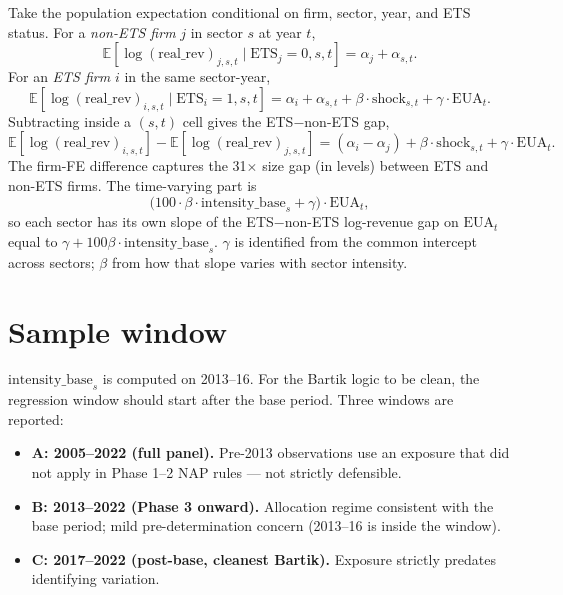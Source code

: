 \documentclass[11pt]{article}
\begin{document}
Take the population expectation conditional on firm, sector, year, and ETS status. For a \emph{non-ETS firm} $j$ in sector $s$ at year $t$,
\begin{equation}
  \mathbb{E}[\log(\mathrm{real\_rev})_{j,s,t} \mid \mathrm{ETS}_j = 0, s, t] = \alpha_j + \alpha_{s,t}. \label{eq:cond_nonets}
\end{equation}
For an \emph{ETS firm} $i$ in the same sector-year,
\begin{equation}
  \mathbb{E}[\log(\mathrm{real\_rev})_{i,s,t} \mid \mathrm{ETS}_i = 1, s, t] = \alpha_i + \alpha_{s,t} + \beta \cdot \mathrm{shock}_{s,t} + \gamma \cdot \mathrm{EUA}_t. \label{eq:cond_ets}
\end{equation}
Subtracting inside a $(s,t)$ cell gives the ETS$-$non-ETS gap,
\begin{equation}
  \mathbb{E}[\log(\mathrm{real\_rev})_{i,s,t}] - \mathbb{E}[\log(\mathrm{real\_rev})_{j,s,t}] = (\alpha_i - \alpha_j) + \beta \cdot \mathrm{shock}_{s,t} + \gamma \cdot \mathrm{EUA}_t.
\end{equation}
The firm-FE difference captures the 31$\times$ size gap (in levels) between ETS and non-ETS firms. The time-varying part is
\[
  \big(100 \cdot \beta \cdot \mathrm{intensity\_base}_s + \gamma\big) \cdot \mathrm{EUA}_t,
\]
so each sector has its own slope of the ETS$-$non-ETS log-revenue gap on $\mathrm{EUA}_t$ equal to $\gamma + 100\beta \cdot \mathrm{intensity\_base}_s$. $\gamma$ is identified from the common intercept across sectors; $\beta$ from how that slope varies with sector intensity.

\section{Sample window}

$\mathrm{intensity\_base}_s$ is computed on 2013--16. For the Bartik logic to be clean, the regression window should start after the base period. Three windows are reported:
\begin{itemize}
  \item \textbf{A: 2005--2022 (full panel).} Pre-2013 observations use an exposure that did not apply in Phase 1--2 NAP rules --- not strictly defensible.
  \item \textbf{B: 2013--2022 (Phase 3 onward).} Allocation regime consistent with the base period; mild pre-determination concern (2013--16 is inside the window).
  \item \textbf{C: 2017--2022 (post-base, cleanest Bartik).} Exposure strictly predates identifying variation.
\end{itemize}
\end{document}
